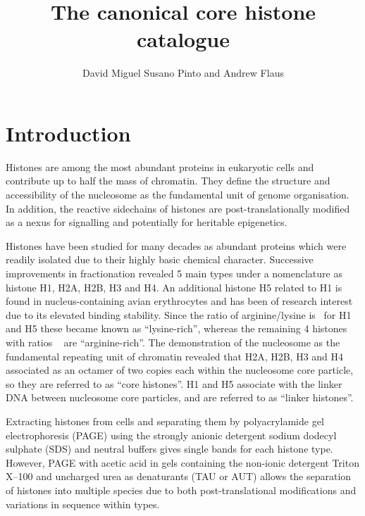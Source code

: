 \documentclass[10pt,a4paper,draft,article]{memoir}
\author{David Miguel Susano Pinto and Andrew Flaus}
\title{The canonical core histone catalogue}
\begin{document}
  \maketitle

  \section{Introduction}

    Histones are among the most abundant proteins in eukaryotic cells and contribute up
    to half the mass of chromatin. They define the structure and accessibility of the
    nucleosome as the fundamental unit of genome organisation. In addition, the reactive
    sidechains of histones are post-translationally modified as a nexus for signalling
    and potentially for heritable epigenetics.

    Histones have been studied for many decades as abundant proteins which were readily
    isolated due to their highly basic chemical character. Successive improvements in
    fractionation revealed 5 main types under a nomenclature as histone H1, H2A, H2B, H3
    and H4\citep{nomenclature}.  %
    An additional histone H5 related to H1 is found in nucleus-containing avian
    erythrocytes and has been of research interest due to its elevated binding stability.
    Since the ratio of arginine/lysine is \HOneArgLysRatio\ for H1 and H5 these became known as
    ``lysine-rich'', whereas the remaining 4 histones with ratios \OthersArgLysRatio\  are ``arginine-rich''.
    The demonstration of the nucleosome as the fundamental repeating unit of chromatin revealed
    that H2A, H2B, H3 and H4 associated as an octamer of two copies each within the
    nucleosome core particle, so they are referred to as ``core histones''. H1 and H5
    associate with the linker DNA between nucleosome core particles, and are referred to
    as ``linker histones''.

    Extracting histones from cells and separating them by polyacrylamide gel electrophoresis
    (PAGE) using the strongly anionic detergent sodium dodecyl sulphate (SDS) and neutral
    buffers gives single bands for each histone type. However, PAGE with acetic acid in gels
    containing the non-ionic detergent Triton X--100 and uncharged urea as denaturants
    (TAU or AUT) allows the separation of histones into multiple species due to both
    post-translational modifications and variations in sequence within types.
\end{document}
